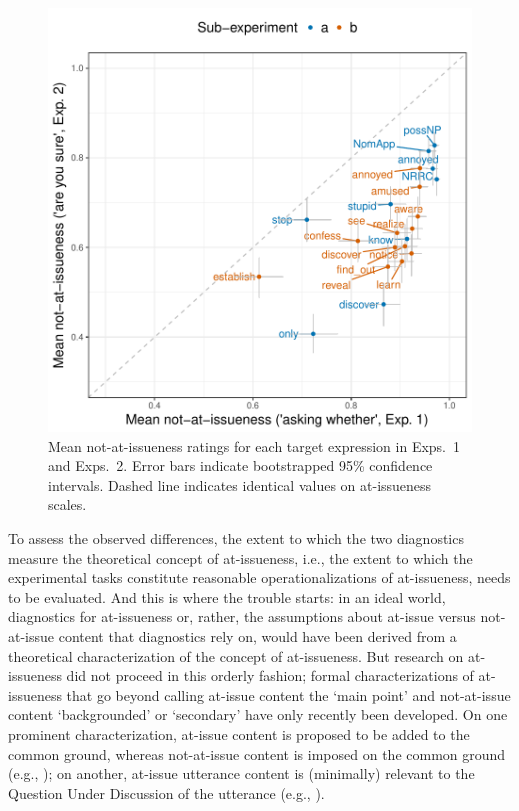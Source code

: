 \documentclass[11pt,fleqn]{article}
\newcommand{\6}{\mbox{$[\hspace*{-.6mm}[$}}
\newcommand{\9}{\mbox{$]\hspace*{-.6mm}]$}}
\begin{document}
\begin{figure}[!h]
\begin{center}

\includegraphics[width=12cm]{../results/ai-meta-analysis/graphs/correlation-bytrigger}

\end{center}
\caption{Mean not-at-issueness ratings for each target expression in Exps.~1 and Exps.~2. Error bars indicate bootstrapped 95\% confidence intervals. Dashed line indicates identical values on at-issueness scales.}
\label{fig:ai-correlation}
\end{figure}


To assess the observed differences, the extent to which the two diagnostics measure the theoretical concept of at-issueness, i.e., the extent to which the experimental tasks constitute reasonable operationalizations of at-issueness, needs to be evaluated. And this is where the trouble starts: in an ideal world, diagnostics for at-issueness or, rather, the assumptions about at-issue versus not-at-issue content that diagnostics rely on, would have been derived from a theoretical characterization of the concept of at-issueness. But research on at-issueness did not proceed in this orderly fashion;  formal characterizations of at-issueness that go beyond calling at-issue content the `main point' and not-at-issue content `backgrounded' or `secondary' have only recently been developed. On one prominent characterization, at-issue content is proposed to be added to the common ground, whereas not-at-issue content is imposed on the common ground (e.g., \citealt{murray2014,anderbois-etal2015}); on another, at-issue utterance content is (minimally) relevant to the Question Under Discussion of the utterance (e.g., \citealt{brst-salt10,brst-ar}). 
\end{document}
